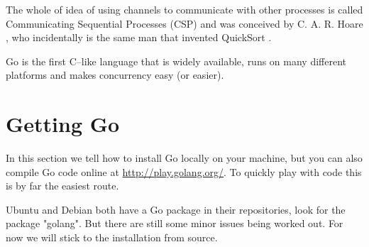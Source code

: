 The whole of idea of using channels to communicate with other processes
is called Communicating Sequential Processes (CSP) and was conceived
by C. A. R. Hoare \cite{hoare}, who incidentally is the same man that
invented QuickSort \cite{quicksort}.

\begin{lbar}[]
Go is the first C--like language that is widely available,
runs on many
different platforms and makes concurrency easy (or easier).
\end{lbar}

\section{Getting Go}
In this section we tell how to install Go locally on your machine, but you can
also compile Go code online at \url{http://play.golang.org/}. To quickly
play with code this is by far the easiest route.

Ubuntu and Debian both have a Go package in their repositories, look for
the package "golang". But there are still some minor issues being worked
out. For now we will stick to the installation from source.

